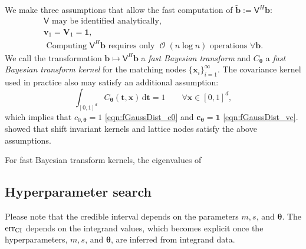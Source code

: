 \documentclass{svjour3}                     %
\DeclareMathOperator{\Order}{{\mathcal O}}
\newcommand{\bm}[1]{\boldsymbol{#1}}
\newcommand{\D}[1]{\text{d}{#1}}
\newcommand{\vtheta}{{\bm{\theta}}}
\newcommand{\vb}{\bm{b}}
\newcommand{\vc}{\bm{c}}
\newcommand{\vt}{\bm{t}}
\newcommand{\vv}{\bm{v}}
\newcommand{\vV}{\bm{V}}
\newcommand{\vx}{\bm{x}}
\newcommand{\vone}{\bm{1}}
\newcommand{\mV}{\mathsf{V}}
\newcommand{\CI}{\textup{CI}}
\newcommand{\err}{\textup{err}}
\begin{document}
We make three assumptions that allow the fast computation of $\widetilde{\vb} := \mV^H \vb$:
\begin{subequations} \label{fastcompAssump}
	\begin{gather}
	\label{fastcompAssumpA}
	\mV \text{ may be identified analytically}, \\
	\label{fastcompAssumpB}
	\vv_1 = \vV_1 = \vone, \\
	\label{fastcompAssumpC}
	\text{ Computing $\mV^H \vb$ requires only $\Order(n \log n)$ operations } \forall \vb.
	\end{gather}
\end{subequations}
We call the transformation $\vb \mapsto \mV^H \vb$ a \emph{fast Bayesian transform} and $C_\vtheta$ a \emph{fast Bayesian transform kernel} for the matching nodes $\{\vx_i\}_{i=1}^\infty$.  The covariance kernel used in practice also may satisfy an additional assumption:
\begin{equation} \label{addAssump}
\int_{[0,1]^d} C_\vtheta(\vt,\vx) \, \D \vt = 1 \qquad \forall \vx \in [0,1]^d,
\end{equation}
which implies that $c_{0,\vtheta} = 1$ \eqref{eqn:fGaussDist_c0} and $\vc_{\vtheta} = \vone$ 	\eqref{eqn:fGaussDist_vc}.  \cite{RatHic19a} showed that shift invariant kernels and lattice nodes satisfy the above assumptions.

For fast Bayesian transform kernels, the eigenvalues of 


\subsection{Hyperparameter search} \label{sec:hyperparameters}

Please note that the credible interval depends on the parameters $m, s$, and $\vtheta$.
The $\err_{\CI}$ depends on the integrand values, which becomes explicit once the hyperparameters, $m, s$, and $\vtheta$, are inferred from integrand data. 


\end{document}
